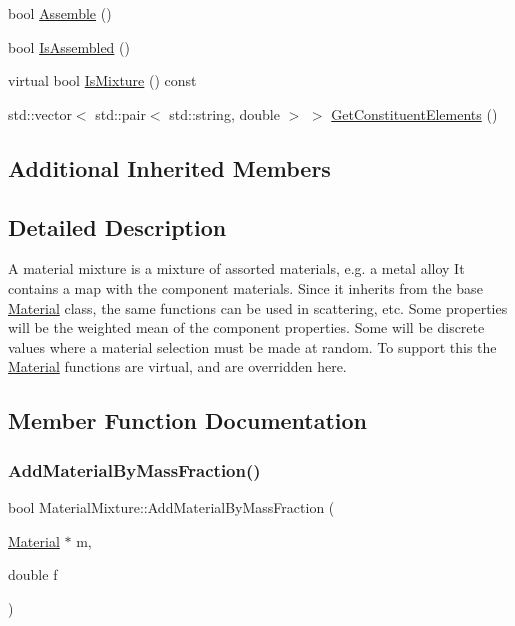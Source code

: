 \begin{DoxyCompactItemize}
\item 
bool \hyperlink{classMaterialMixture_aa7e9fe0d5261c41b91ecd9843887416e}{Assemble} ()
\item 
bool \hyperlink{classMaterialMixture_a859435679b11be52ab5b92bfacb95d17}{Is\+Assembled} ()
\item 
virtual bool \hyperlink{classMaterialMixture_ac9ff85c8bc6ea548e91b35f10c312f74}{Is\+Mixture} () const
\item 
std\+::vector$<$ std\+::pair$<$ std\+::string, double $>$ $>$ \hyperlink{classMaterialMixture_a41c2bd2c8228e49ceb09b641935239b4}{Get\+Constituent\+Elements} ()
\end{DoxyCompactItemize}
\subsection*{Additional Inherited Members}


\subsection{Detailed Description}
A material mixture is a mixture of assorted materials, e.\+g. a metal alloy It contains a map with the component materials. Since it inherits from the base \hyperlink{classMaterial}{Material} class, the same functions can be used in scattering, etc. Some properties will be the weighted mean of the component properties. Some will be discrete values where a material selection must be made at random. To support this the \hyperlink{classMaterial}{Material} functions are virtual, and are overridden here. 

\subsection{Member Function Documentation}
\mbox{\label{classMaterialMixture_af45689244f830ba85046d7abec5125d1}} 
\subsubsection{\texorpdfstring{Add\+Material\+By\+Mass\+Fraction()}{AddMaterialByMassFraction()}}
{\footnotesize\ttfamily bool Material\+Mixture\+::\+Add\+Material\+By\+Mass\+Fraction (\begin{DoxyParamCaption}\item[{\hyperlink{classMaterial}{Material} $\ast$}]{m,  }\item[{double}]{f }\end{DoxyParamCaption})}

